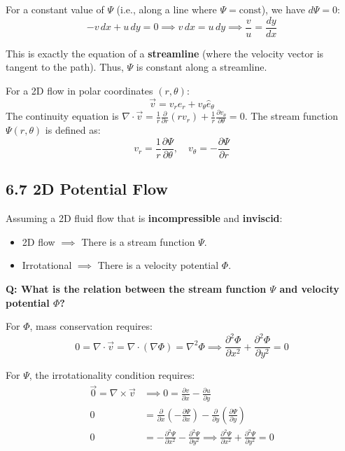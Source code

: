 For a constant value of $\Psi$ (i.e., along a line where $\Psi = \text{const}$), we have $d\Psi = 0$:
\begin{equation}
    -v\,dx + u\,dy = 0 \implies v\,dx = u\,dy \implies \frac{v}{u} = \frac{dy}{dx}
\end{equation}

This is exactly the equation of a \textbf{streamline} (where the velocity vector is tangent to the path). Thus, $\Psi$ is constant along a streamline.

\begin{notebox}
For a 2D flow in polar coordinates $(r, \theta)$:
\begin{equation*}
    \vec{v} = v_r \hat{e}_r + v_\theta \hat{e}_\theta
\end{equation*}
The continuity equation is $\nabla \cdot \vec{v} = \frac{1}{r}\frac{\partial}{\partial r}(r v_r) + \frac{1}{r}\frac{\partial v_\theta}{\partial \theta} = 0$.
The stream function $\Psi(r, \theta)$ is defined as:
\begin{equation}
    v_r = \frac{1}{r}\frac{\partial \Psi}{\partial \theta}, \quad v_\theta = -\frac{\partial \Psi}{\partial r}
\end{equation}
\end{notebox}

\subsection{6.7 2D Potential Flow}

Assuming a 2D fluid flow that is \textbf{incompressible} and \textbf{inviscid}:
\begin{itemize}
    \item 2D flow $\implies$ There is a stream function $\Psi$.
    \item Irrotational $\implies$ There is a velocity potential $\Phi$.
\end{itemize}

\textbf{Q: What is the relation between the stream function $\Psi$ and velocity potential $\Phi$?}

For $\Phi$, mass conservation requires:
\begin{equation}
    0 = \nabla \cdot \vec{v} = \nabla \cdot (\nabla \Phi) = \nabla^2 \Phi \implies \boxed{\frac{\partial^2 \Phi}{\partial x^2} + \frac{\partial^2 \Phi}{\partial y^2} = 0}
\end{equation}

For $\Psi$, the irrotationality condition requires:
\begin{align}
    \vec{0} = \nabla \times \vec{v} &\implies 0 = \frac{\partial v}{\partial x} - \frac{\partial u}{\partial y} \\
    0 &= \frac{\partial}{\partial x}\left(-\frac{\partial \Psi}{\partial x}\right) - \frac{\partial}{\partial y}\left(\frac{\partial \Psi}{\partial y}\right) \\
    0 &= -\frac{\partial^2 \Psi}{\partial x^2} - \frac{\partial^2 \Psi}{\partial y^2} \implies \boxed{\frac{\partial^2 \Psi}{\partial x^2} + \frac{\partial^2 \Psi}{\partial y^2} = 0}
\end{align}

